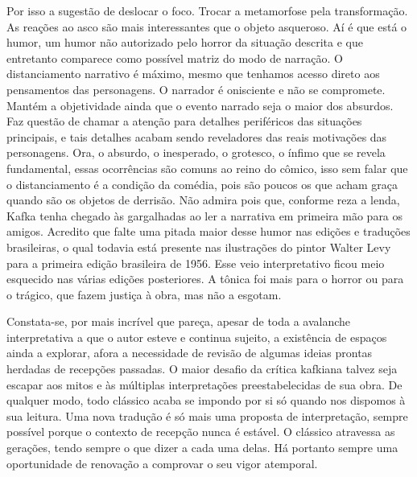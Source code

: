 Por isso a sugestão de deslocar o foco. Trocar a metamorfose pela
transformação. As reações ao asco são mais interessantes que o objeto
asqueroso. Aí é que está o humor, um humor não autorizado pelo horror
da situação descrita e que entretanto comparece como possível matriz do
modo de narração. O distanciamento narrativo é máximo, mesmo que
tenhamos acesso direto aos pensamentos das personagens. O narrador é
onisciente e não se compromete. Mantém a objetividade ainda que o
evento narrado seja o maior dos absurdos. Faz questão de chamar a
atenção para detalhes periféricos das situações principais, e tais
detalhes acabam sendo reveladores das reais motivações das personagens.
Ora, o absurdo, o inesperado, o grotesco, o ínfimo que se revela
fundamental, essas ocorrências são comuns ao reino do cômico, isso sem
falar que o distanciamento é a condição da comédia, pois são poucos os
que acham graça quando são os objetos de derrisão. Não admira pois que,
conforme reza a lenda, Kafka tenha chegado às gargalhadas ao ler a
narrativa em primeira mão para os amigos. Acredito que falte uma pitada
maior desse humor nas edições e traduções brasileiras, o qual todavia
está presente nas ilustrações do pintor Walter Levy para a primeira
edição brasileira de 1956. Esse veio interpretativo ficou meio esquecido nas
várias edições posteriores. A tônica foi mais para o horror ou para o
trágico, que fazem justiça à obra, mas não a esgotam.

Constata-se, por mais incrível que pareça, apesar de toda a avalanche
interpretativa a que o autor esteve e continua sujeito, a existência de
espaços ainda a explorar, afora a necessidade de revisão de algumas
ideias prontas herdadas de recepções passadas. O maior desafio da
crítica kafkiana talvez seja escapar aos mitos e às múltiplas
interpretações preestabelecidas de sua obra. De qualquer modo, todo
clássico acaba se impondo por si só quando nos dispomos à sua leitura.
Uma nova tradução é só mais uma proposta de interpretação, sempre
possível porque o contexto de recepção nunca é estável. O clássico
atravessa as gerações, tendo sempre o que dizer a cada uma delas. Há
portanto sempre uma oportunidade de renovação a comprovar o seu vigor
atemporal.


